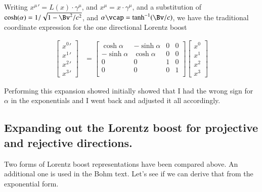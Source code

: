 \documentclass{article}
\begin{document}
Writing ${x^\mu}' = L(x) \cdot \gamma^\mu$, and $x^\mu = x \cdot \gamma^\mu$,
and a substitution of $\cosh(\alpha) = 1/\sqrt{1 - \Bv^2/c^2}$, and $\alpha \vcap = \tanh^{-1}(\Bv/c)$,
we have the traditional coordinate
expression for the one directional Lorentz boost

\begin{align}
\begin{bmatrix}
{x^0}' \\
{x^1}' \\
{x^2}' \\
{x^3}'
\end{bmatrix}
&=
\begin{bmatrix}
\cosh\alpha & -\sinh\alpha & 0 & 0 \\
-\sinh\alpha & \cosh\alpha & 0 & 0 \\
0 & 0 & 1 & 0 \\
0 & 0 & 0 & 1 \\
\end{bmatrix}
\begin{bmatrix}
x^0 \\
x^1 \\
x^2 \\
x^3
\end{bmatrix}
\end{align}

Performing this expansion showed initially showed that I had the wrong sign for $\alpha$ in the exponentials and I went back and
adjusted it all accordingly.

\subsection{ Expanding out the Lorentz boost for projective and rejective directions. }

Two forms of Lorentz boost representations have been compared above.  An additional one is used in the Bohm text.  Let's see
if we can derive that from the exponential form.
\end{document}
